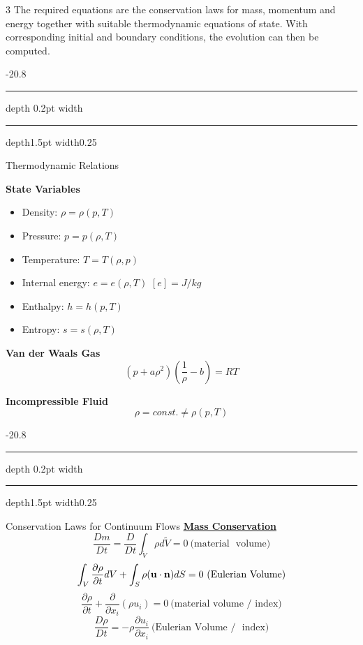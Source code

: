 \documentclass[8pt, landscape, fleqn]{scrartcl}
\makeatletter
\renewcommand{\section}{\@startsection{section}{1}{0mm}%
{-2\baselineskip}{0.8\baselineskip}%
{\hrule depth 0.2pt width\columnwidth\hrule depth1.5pt
width0.25\columnwidth\vspace*{1.2em}\Large\bfseries\rmfamily}}
\makeatother
\begin{document}
\begin{multicols*}{3}
The required equations are the conservation laws for mass, momentum and energy together with suitable thermodynamic equations of state. With corresponding initial and boundary conditions, the evolution can then be computed.

\section{Thermodynamic Relations}

\textbf{State Variables}

\begin{itemize}
    \item Density: $\rho = \rho(p,T)$
    \item Pressure: $p = p(\rho,T)$
    \item Temperature: $T = T(\rho, p)$
    \item Internal energy: $e = e(\rho, T)$ $[e] = J/kg$
    \item Enthalpy: $h = h(p,T)$
    \item Entropy: $s = s(\rho, T)$
\end{itemize}

\textbf{Van der Waals Gas}
\begin{equation*}
    (p+a\rho^2)\left(\frac{1}{\rho}-b\right) = RT
\end{equation*}


\textbf{Incompressible Fluid}
\begin{equation*}
    \rho = const. \neq \rho(p,T)
\end{equation*}

\section{Conservation Laws for Continuum Flows}
\underline{\textbf{Mass Conservation}} \\
\begin{equation*}
	\frac{Dm}{Dt} = \frac{D}{Dt}\int_{\tilde V} \rho d\tilde V = 0 ~\text{(material~ volume)}
\end{equation*}
\begin{equation*}
	\int_V \frac{\partial \rho}{\partial t} dV + \int_S \rho(\bold{u}\cdot \bold{n}) dS = 0~\text{(Eulerian~Volume)}
\end{equation*}
\begin{equation*}
	\frac{\partial \rho}{\partial t} + \frac{\partial}{\partial x_i}(\rho u_i) = 0~\text{(material~volume~/~index)}
\end{equation*}
\begin{equation*}
	\frac{D\rho}{Dt} = -\rho \frac{\partial u_i}{\partial x_i}~\text{(Eulerian~Volume / ~index)}
\end{equation*}


\end{multicols*}
\end{document}
